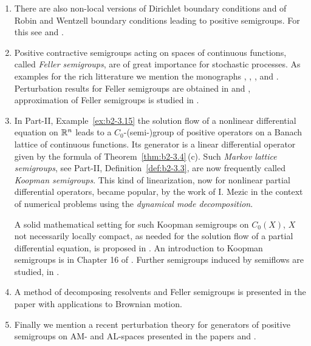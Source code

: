 \begin{enumerate}
\item
There are also non-local versions of Dirichlet boundary conditions  and of Robin and Wentzell boundary conditions leading to positive semigroups. 
For this see \textcite{zbmath07220470} and \textcite{arXiv:2502.03216}. 

\item
Positive contractive semigroups acting on spaces of continuous functions, called \emph{Feller semigroups}, are of great importance for stochastic processes. 
As examples for the rich litterature we mention the monographs \textcite{zbmath06314001}, \textcite{zbmath05714362}, \textcite{zbmath01707584}, \textcite{zbmath01807482}  and  \textcite{zbmath02189175}. 
Perturbation results for Feller semigroups are obtained in \textcite{zbmath06286612} and \textcite{zbmath07606117}, approximation of Feller semigroups is studied in  \textcite{zbmath07694938}.


\item
In Part-II, Example~\ref{ex:b2-3.15} the solution flow of a nonlinear differential
equation on $\mathbb{R}^{n}$ leads to a $C_{0}$-(semi-)group of
positive operators  on a Banach lattice of continuous functions. 
Its generator is a linear differential operator given by the formula of Theorem~\ref{thm:b2-3.4}\,\upshape(c).
Such \emph{Markov lattice semigroups}, see Part-II, Definition~\ref{def:b2-3.3}, are now
frequently called \emph{Koopman semigroups}. 
This kind of linearization, now for nonlinear partial differential operators, became popular, \eg by the work of I. Mezic \cite{zbmath05045798} in the context of numerical problems using the \emph{dynamical mode decomposition}. 

A solid mathematical setting for such Koopman semigroups
on $C_{0}(X)$, $X$ not necessarily locally compact, as needed for the solution flow of a partial differential equation,  is proposed in \textcite{MR4176386}. 
An introduction to Koopman semigroups is in Chapter 16  of \textcite{zbmath06695787}.
Further semigroups induced by semiflows are studied, \eg in \textcite{zbmath07995939}.

\item 
A method of decomposing resolvents and Feller semigroups is presented in the paper \textcite{zbmath07986074} with applications to Brownian motion.

\item
Finally we mention a recent perturbation theory for generators of positive semigroups on AM- and AL-spaces presented in the papers \textcite{zbmath07971662} and \textcite{zbmath06893038}.

\end{enumerate}
